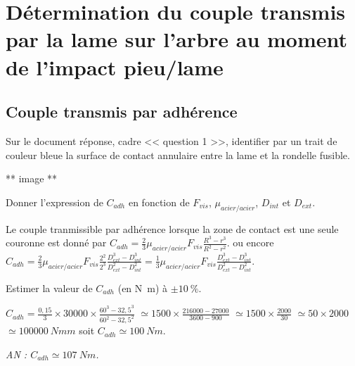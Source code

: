 \documentclass[11pt]{article}
\begin{document}
\UPSTIpreambuleEpreuve	%



\section{Détermination du couple transmis par la lame sur l'arbre au moment de l'impact pieu/lame}

\subsection{Couple transmis par adhérence}

\UPSTIquestion* Sur le document réponse, cadre << question 1 >>, identifier par un trait de couleur bleue la surface de contact annulaire entre la lame et la rondelle fusible. 

\begin{UPSTIcorrige}

** image ** 
\end{UPSTIcorrige}

\UPSTIquestion Donner l'expression de $C_{{adh}}$ en fonction de $F_{{vis}}$, $\mu_{{acier/acier}}$, $D_{{int}}$ et $D_{{ext}}$.

\begin{UPSTIcorrige}
Le couple tranmissible par adhérence lorsque la zone de contact est une seule couronne est donné par 
$C_{adh}=\frac{2}{3} \mu_{{acier/acier}}F_{{vis}} \frac{R^3-r^3}{R^2 - r^2}$.
 ou encore  $C_{adh}=\frac{2}{3} \mu_{{acier/acier}}F_{{vis}} \frac{2^2}{2^3}\frac{D_{{ext}}^3-D_{{int}}^3}{D_{{ext}}^2 - D_{{int}}^2}=\frac{1}{3} \mu_{{acier/acier}}F_{{vis}} \frac{D_{{ext}}^3-D_{{int}}^3}{D_{{ext}}^2 - D_{{int}}^2}$.
\end{UPSTIcorrige}


\UPSTIquestion Estimer la valeur de $C_{{adh}}$ (en \si{N.m}) à $\pm\SI{10}{\%}$.

\begin{UPSTIcorrige}
$C_{adh}=\frac{0,15}{3} \times 30000 \times \frac{60^3-32,5^3}{60^2 - 32,5^2}$
$\simeq 1500\times \frac{216000-27000}{3600 - 900}$
$\simeq 1500\times \frac{2000}{30}$
$\simeq 50\times 2000$
$\simeq \SI{100 000}{Nmm}$
soit $C_{adh}\simeq \SI{100}{Nm}$.

\textit{AN : $C_{adh}\simeq \SI{107}{Nm}$.}

\end{UPSTIcorrige}
\end{document}
